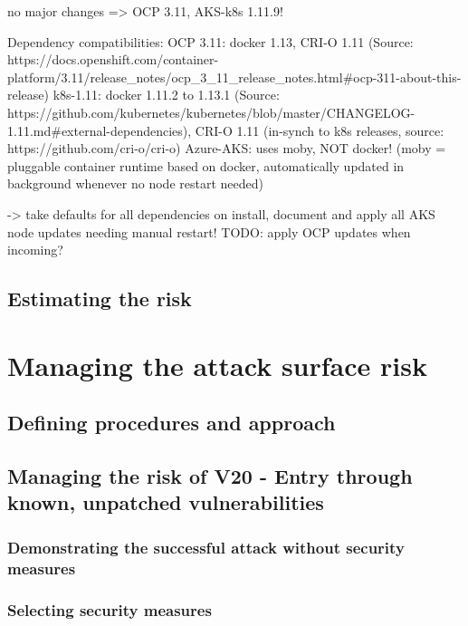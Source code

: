 no major changes => OCP 3.11, AKS-k8s 1.11.9!

Dependency compatibilities:
OCP 3.11: docker 1.13, CRI-O 1.11 (Source: https://docs.openshift.com/container-platform/3.11/release_notes/ocp_3_11_release_notes.html#ocp-311-about-this-release)
k8s-1.11: docker 1.11.2 to 1.13.1  (Source: https://github.com/kubernetes/kubernetes/blob/master/CHANGELOG-1.11.md#external-dependencies), CRI-O 1.11 (in-synch to k8s releases, source: https://github.com/cri-o/cri-o)
Azure-AKS: uses moby, NOT docker! (moby = pluggable container runtime based on docker, automatically updated in background whenever no node restart needed)

-> take defaults for all dependencies on install, document and apply all AKS node updates needing manual restart!
TODO: apply OCP updates when incoming?


\section{Estimating the risk}

\chapter{Managing the attack surface risk}

\section{Defining procedures and approach}

\section{Managing the risk of V20 - Entry through known, unpatched vulnerabilities}

\subsection{Demonstrating the successful attack without security measures}

\subsection{Selecting security measures}

